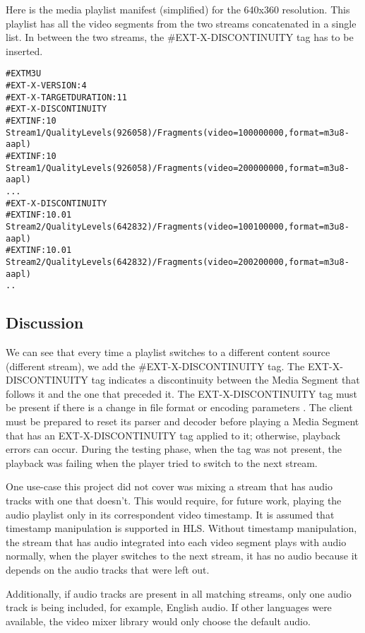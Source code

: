 Here is the media playlist manifest (simplified) for the 640x360 resolution. This playlist has all the video segments from the two streams concatenated in a single list. In between the two streams, the \#EXT-X-DISCONTINUITY tag has to be inserted.

\begin{lstlisting}
#EXTM3U
#EXT-X-VERSION:4
#EXT-X-TARGETDURATION:11
#EXT-X-DISCONTINUITY
#EXTINF:10
Stream1/QualityLevels(926058)/Fragments(video=100000000,format=m3u8-aapl)
#EXTINF:10
Stream1/QualityLevels(926058)/Fragments(video=200000000,format=m3u8-aapl)
...
#EXT-X-DISCONTINUITY
#EXTINF:10.01
Stream2/QualityLevels(642832)/Fragments(video=100100000,format=m3u8-aapl)
#EXTINF:10.01
Stream2/QualityLevels(642832)/Fragments(video=200200000,format=m3u8-aapl)
..
\end{lstlisting}

\subsection{Discussion}

We can see that every time a playlist switches to a different content source (different stream), we add the \#EXT-X-DISCONTINUITY tag. The EXT-X-DISCONTINUITY tag indicates a discontinuity between the Media Segment that follows it and the one that preceded it. The EXT-X-DISCONTINUITY tag must be present if there is a change in file format or encoding parameters \cite{refs}. The client must be prepared to reset its parser and decoder before playing a Media Segment that has an EXT-X-DISCONTINUITY tag applied to it; otherwise, playback errors can occur. During the testing phase, when the tag was not present, the playback was failing when the player tried to switch to the next stream.
   
One use-case this project did not cover was mixing a stream that has audio tracks with one that doesn't. This would require, for future work, playing the audio playlist only in its correspondent video timestamp. It is assumed that timestamp manipulation is supported in HLS. Without timestamp manipulation, the stream that has audio integrated into each video segment plays with audio normally, when the player switches to the next stream, it has no audio because it depends on the audio tracks that were left out.

Additionally, if audio tracks are present in all matching streams, only one audio track is being included, for example, English audio. If other languages were available, the video mixer library would only choose the default audio.